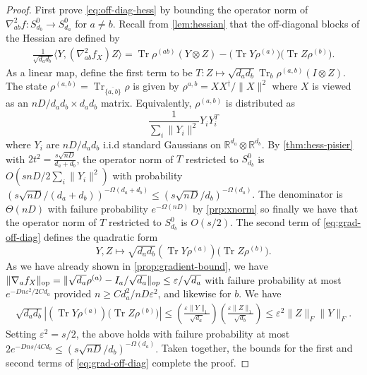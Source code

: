 \documentclass[aos]{imsart}
\theoremstyle{definition}
\DeclareMathOperator{\op}{op}
\DeclareMathOperator{\tr}{Tr}
\DeclarePairedDelimiter{\norm}{\lVert}{\rVert}
\newcommand{\R}{{\mathbb{R}}}
\newcommand{\ot}{\otimes}
\newcommand{\eps}{\varepsilon}
\newcommand{\Sym}{\mathcal{S}}
\newcommand{\smallSym}{S}
\newcommand{\rv}{X}
\newcommand{\CF}[1]{{\color{purple}[CF: #1]}}
\begin{document}
\begin{proof}
First prove \cref{eq:off-diag-hess} by bounding the operator norm of $\nabla^2_{ab} f: \smallSym^0_{d_b} \to \smallSym^0_{d_a}$ for $a \neq b$. Recall from \cref{lem:hessian} that the off-diagonal blocks of the Hessian are defined by
\begin{align}\frac1{\sqrt{d_a d_b}} \langle Y,  \left( \nabla^2_{ab} f_{\rv} \right) Z \rangle
= \tr \rho^{(ab)} \left( Y \ot Z \right) - \bigl(\tr Y \rho^{(a)}\bigr)\bigl(\tr Z \rho^{(b)}\bigr).\label{eq:grad-off-diag}\end{align}
As a linear map, define the first term to be $T:Z \mapsto \sqrt{d_a d_b} \tr_b \rho^{(a,b)} (I \ot Z)$. The state $\rho^{(a,b)} = \tr_{\overline{\{a,b\}}} \rho$ is given by $\rho^{{a,b}} =  X X^\dagger/\|X\|^2$ where $X$ is viewed as an $n D/{d_a d_b} \times d_a d_b$ matrix. Equivalently, $\rho^{(a,b)}$ is distributed as
$$\frac{1}{\sum_{i} \|Y_i\|^2} Y_i Y_i^T$$ where $Y_i$ are $n D/{d_a d_b}$ i.i.d standard Gaussians on $\R^{d_a} \ot \R^{d_b}$. By \cref{thm:hess-pisier} with $2t^2 = \frac {s \sqrt{nD}}{d_a + d_b}$, the operator norm of $T$ restricted to $\smallSym^0_{d_b}$ is $O(s n D /2 \sum_i \|Y_i\|^2 )$
with probability $(s \sqrt{nD}/(d_a + d_b))^{ - \Omega(d_a + d_b)} \leq (s \sqrt{nD} /d_b)^{ - \Omega(d_a)}$. The denominator is $\Theta(nD)$ with failure probability $e^{ -\Omega(nD)} $ by \cref{prp:xnorm} so finally we have that the operator norm of $T$ restricted to $\smallSym^0_{d_b}$ is $O \left( s/2\right)$.
The second term of \cref{eq:grad-off-diag} defines the quadratic form
$$Y,Z \mapsto \sqrt{d_a d_b} (\tr Y \rho^{(a)})\bigl(\tr Z \rho^{(b)}\bigr).$$
As we have already shown in \cref{prop:gradient-bound}, we have $\norm{\nabla_a f_{\rv}}_{\op} = \|\sqrt{d_a} \rho^{(a)} - I_a/\sqrt{d_a}\|_{op} \leq \eps/\sqrt{d_a}$ with failure probability at most $e^{-D n \eps^2/2Cd_a}$ provided $n \geq C  d_a^2/n D \eps^2$, and likewise for $b$. We have
\begin{align}\sqrt{d_a d_b} |(\tr Y  \rho^{(a)})\bigl(\tr Z \rho^{(b)}\bigr)| \leq \left( \frac{\eps \|Y\|_{1}}{\sqrt{d_{a}}} \right) \left( \frac{\eps \|Z\|_{1}}{\sqrt{d_{b}}} \right) \leq \eps^2 \|Z\|_F\|Y\|_F. \label{eq:second-term-hess}\end{align}
Setting $\eps^2 =  s/2$, the above holds with failure probability at most $2e^{- Dn s /4Cd_b}  \leq (s \sqrt{nD} /d_b)^{ - \Omega(d_a)}.$ Taken together, the bounds for the first and second terms of \cref{eq:grad-off-diag} complete the proof. %


\end{proof}
\end{document}

